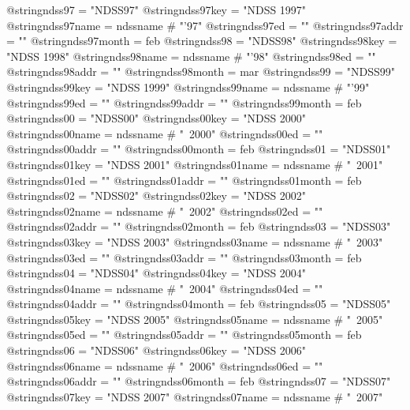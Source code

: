@string{ndss97 =                "NDSS97"}
@string{ndss97key =             "NDSS 1997"}
@string{ndss97name =            ndssname # "'97"}
@string{ndss97ed =              ""}
@string{ndss97addr =            ""}
@string{ndss97month =           feb}
@string{ndss98 =                "NDSS98"}
@string{ndss98key =             "NDSS 1998"}
@string{ndss98name =            ndssname # "'98"}
@string{ndss98ed =              ""}
@string{ndss98addr =            ""}
@string{ndss98month =           mar}
@string{ndss99 =                "NDSS99"}
@string{ndss99key =             "NDSS 1999"}
@string{ndss99name =            ndssname # "'99"}
@string{ndss99ed =              ""}
@string{ndss99addr =            ""}
@string{ndss99month =           feb}
@string{ndss00 =                "NDSS00"}
@string{ndss00key =             "NDSS 2000"}
@string{ndss00name =            ndssname # "~2000"}
@string{ndss00ed =              ""}
@string{ndss00addr =            ""}
@string{ndss00month =           feb}
@string{ndss01 =                "NDSS01"}
@string{ndss01key =             "NDSS 2001"}
@string{ndss01name =            ndssname # "~2001"}
@string{ndss01ed =              ""}
@string{ndss01addr =            ""}
@string{ndss01month =           feb}
@string{ndss02 =                "NDSS02"}
@string{ndss02key =             "NDSS 2002"}
@string{ndss02name =            ndssname # "~2002"}
@string{ndss02ed =              ""}
@string{ndss02addr =            ""}
@string{ndss02month =           feb}
@string{ndss03 =                "NDSS03"}
@string{ndss03key =             "NDSS 2003"}
@string{ndss03name =            ndssname # "~2003"}
@string{ndss03ed =              ""}
@string{ndss03addr =            ""}
@string{ndss03month =           feb}
@string{ndss04 =                "NDSS04"}
@string{ndss04key =             "NDSS 2004"}
@string{ndss04name =            ndssname # "~2004"}
@string{ndss04ed =              ""}
@string{ndss04addr =            ""}
@string{ndss04month =           feb}
@string{ndss05 =                "NDSS05"}
@string{ndss05key =             "NDSS 2005"}
@string{ndss05name =            ndssname # "~2005"}
@string{ndss05ed =              ""}
@string{ndss05addr =            ""}
@string{ndss05month =           feb}
@string{ndss06 =                "NDSS06"}
@string{ndss06key =             "NDSS 2006"}
@string{ndss06name =            ndssname # "~2006"}
@string{ndss06ed =              ""}
@string{ndss06addr =            ""}
@string{ndss06month =           feb}
@string{ndss07 =                "NDSS07"}
@string{ndss07key =             "NDSS 2007"}
@string{ndss07name =            ndssname # "~2007"}
